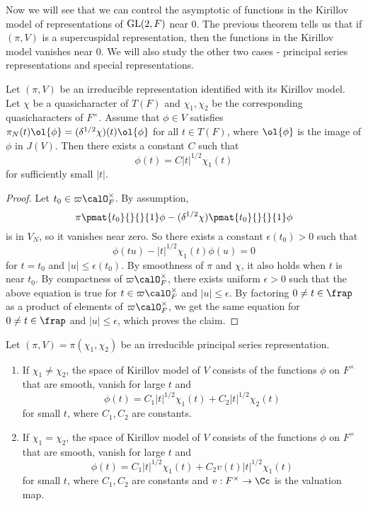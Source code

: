 Now we will see that we can control the asymptotic of functions in the Kirillov model of representations of $\mathrm{GL}(2, F)$ near 0. 
The previous theorem tells us that if $(\pi, V)$ is a supercuspidal representation, then the functions in the Kirillov model vanishes near 0. 
We will also study the other two cases - principal series representations and special representations. 
\begin{proposition}
Let $(\pi, V)$ be an irreducible representation identified with its Kirillov model. 
Let $\chi$ be a quasicharacter of $T(F)$ and $\chi_1, \chi_2$ be the corresponding quasicharacters of $F^{\times}$. 
Assume that $\phi\in V$ satisfies $\pi_N(t)\ol{\phi} = (\delta^{1/2}\chi)(t)\ol{\phi}$ for all $t\in T(F)$, where $\ol{\phi}$ is the image of $\phi$ in $J(V)$. 
Then there exists a constant $C$ such that
$$
\phi(t) = C|t|^{1/2}\chi_1(t)
$$
for sufficiently small $|t|$. 
\end{proposition}
\begin{proof}
Let $t_0 \in \varpi\calO_F^{\times}$. 
By assumption, 
$$
\pi\pmat{t_0}{}{}{1}\phi - (\delta^{1/2}\chi)\pmat{t_0}{}{}{1} \phi
$$
is in $V_N$, so it vanishes near zero. 
So there exists a constant $\epsilon(t_0)>0$ such that 
$$
\phi(tu) - |t|^{1/2}\chi_1(t)\phi(u) = 0
$$
for $t = t_0$ and $|u|\leq \epsilon(t_0)$. 
By smoothness of $\pi$ and $\chi$, it also holds when $t$ is near $t_0$. 
By compactness of $\varpi \calO_F^{\times}$, there exists uniform $\epsilon >0$ such that the above equation is true for $t\in \varpi \calO_{F}^{\times}$ and $|u|\leq \epsilon$. 
By factoring $0\neq t\in \frap$ as a product of elements of $\varpi \calO_{F}^{\times}$, we get the same equation for $0\neq t\in \frap$ and $|u|\leq \epsilon$, which proves the claim. 
\end{proof}
\begin{theorem}
\label{pskr}
Let $(\pi, V) = \pi(\chi_1, \chi_2)$ be an irreducible principal series representation. 
\begin{enumerate}
\item If $\chi_1 \neq \chi_2$, the space of Kirillov model of $V$ consists of the functions $\phi$ on $F^{\times}$ that are smooth, vanish for large $t$ and 
$$
\phi(t) = C_{1}|t|^{1/2}\chi_{1}(t) + C_{2}|t|^{1/2}\chi_2(t)
$$
for small $t$, where $C_1, C_2$ are constants. 
\item If $\chi_1 = \chi_2$, the space of Kirillov model of $V$ consists of the functions $\phi$ on $F^{\times}$ that are smooth, vanish for large $t$ and 
$$
\phi(t) = C_{1}|t|^{1/2} \chi_{1}(t) + C_{2}v(t)|t|^{1/2}\chi_{1}(t)
$$
for small $t$, where $C_1, C_2$ are constants and $v:F^{\times} \to \Cc$ is the valuation map. 
\end{enumerate}
\end{theorem}
